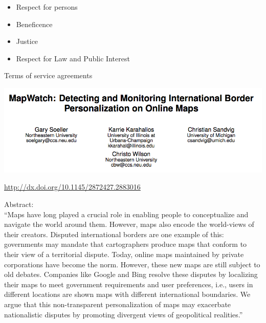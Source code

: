 \documentclass{beamer}
\def\vf{\vfill}
\begin{document}
\begin{frame}

\begin{itemize}
\item Respect for persons
\item Beneficence
\item Justice
\item Respect for Law and Public Interest
\end{itemize}

\end{frame}
\begin{frame}

Terms of service agreements

\end{frame}
\begin{frame}

\begin{center}
\includegraphics[height=0.9\textheight]{figures/soeller_mapwatch_2016_title.png}
\end{center}

\vf
\url{http://dx.doi.org/10.1145/2872427.2883016}
\end{frame}
\begin{frame}

Abstract:\\
``Maps have long played a crucial role in enabling people to conceptualize and navigate the world around them. However, maps also encode the world-views of their creators. Disputed international borders are one example of this: governments may mandate that cartographers produce maps that conform to their view of a territorial dispute. Today, online maps maintained by private corporations have become the norm. However, these new maps are still subject to old debates. Companies like Google and Bing resolve these disputes by localizing their maps to meet government requirements and user preferences, i.e., users in different locations are shown maps with different international boundaries. We argue that this non-transparent personalization of maps may exacerbate nationalistic disputes by promoting divergent views of geopolitical realities.''

\end{frame}
\end{document}
